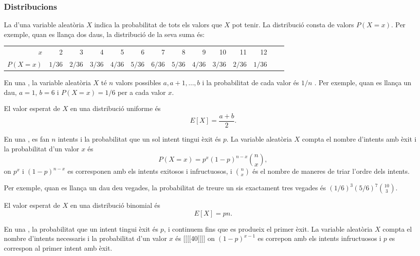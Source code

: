 \subsubsection{Distribucions}


La  d'una variable aleatòria $X$ indica la
probabilitat de tots els valors que $X$ pot tenir. La distribució
consta de valors $P(X=x)$. Per exemple, quan es llança dos daus, la
distribució de la seva suma és:
\begin{center}
\small {
\begin{tabular}{r|rrrrrrrrrrrrr}
$x$ & 2 & 3 & 4 & 5 & 6 & 7 & 8 & 9 & 10 & 11 & 12 \\
$P(X=x)$ & $1/36$ & $2/36$ & $3/36$ & $4/36$ & $5/36$ & $6/36$ & $5/36$ & $4/36$ & $3/36$ & $2/36$ & $1/36$ \\
\end{tabular}
}
\end{center}


 En una , la
variable aleatòria $X$ té $n$ valors possibles $a,a+1,\ldots,b$ i la
probabilitat de cada valor és $1/n$ . Per exemple, quan es llança un
dau, $a=1$, $b=6$ i $P(X=x)=1/6$ per a cada valor $x$.

El valor esperat de $X$ en una distribució uniforme és
\[E[X] = \frac{a+b}{2}.\]


 En una , es fan
$n$ intents i la probabilitat que un sol intent tingui èxit és $p$. La
variable aleatòria $X$ compta el nombre d'intents amb èxit i la
probabilitat d'un valor $x$ és
\[P(X=x)=p^x (1-p)^{n-x} {n \choose x},\]
on $p^x$ i $(1-p)^{n-x}$ es corresponen amb els intents exitosos i
infructuosos, i ${n \choose x}$ és el nombre de maneres de triar
l'ordre dels intents.

Per exemple, quan es llança un dau deu vegades, la probabilitat de
treure un sis exactament tres vegades és $(1/6)^3 (5/6)^7 {10 \choose
  3}$.

El valor esperat de $X$ en una distribució binomial és
\[E[X] = pn.\]


 En una , la
probabilitat que un intent tingui èxit és $p$, i continuem fins que es
produeix el primer èxit. La variable aleatòria $X$ compta el nombre
d'intents necessaris i la probabilitat d'un valor $x$ és [[[[40]]]] on
$(1-p)^{x-1}$ es correpon amb els intents infructuosos i $p$ es
correspon al primer intent amb èxit.

